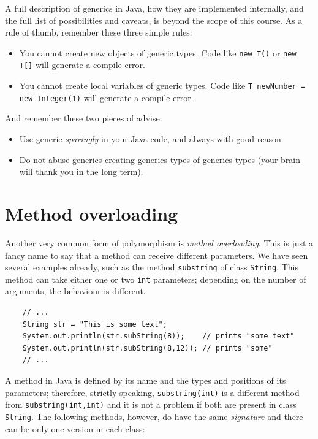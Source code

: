 A full description of generics in Java, how they are implemented
internally, and the full list of possibilities and caveats, is beyond
the scope of this course. As a rule of thumb, remember these three
simple rules: 

\begin{itemize}
\item You cannot create new objects of generic types. Code like
  \verb+new T()+ or \verb+new T[]+ will generate a compile error.
\item You cannot create local variables of generic types. Code like
  \verb+T newNumber = new Integer(1)+ will generate a compile error. 
\end{itemize}

And remember these two pieces of advise: 

\begin{itemize}
\item Use generic \emph{sparingly} in your Java code, and always with
  good reason.
\item Do not abuse generics creating generics types of generics types
  (your brain will thank you in the long term).
\end{itemize}



\section{Method overloading}
\label{sec:method-overloading}

Another very common form of polymorphism is \emph{method
  overloading}. This is just a fancy name to say that a method can
receive different parameters. We have seen several examples already,
such as the method \verb+substring+ of class \verb+String+. This
method can take either one or two \verb+int+ parameters; depending on
the number of arguments, the behaviour is different. 

\begin{verbatim}
    // ...
    String str = "This is some text";
    System.out.println(str.subString(8));    // prints "some text"
    System.out.println(str.subString(8,12)); // prints "some"
    // ...
\end{verbatim}

A method in Java is defined by its name and the types and positions of
its parameters; therefore, strictly speaking, \verb+substring(int)+ is
a different method from \verb+substring(int,int)+ and it is not a
problem if both are present in class \verb+String+. The following
methods, however, do have the same \emph{signature} and there can be
only one version in each class: 

